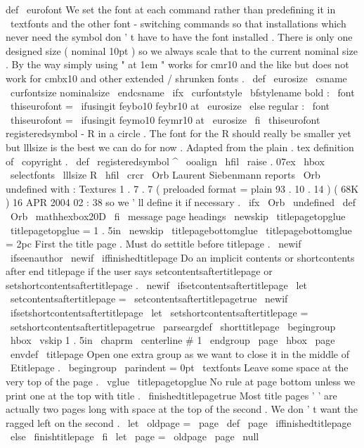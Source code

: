 def
\
eurofont
{
%
%
We
set
the
font
at
each
command
rather
than
predefining
it
in
%
\
textfonts
and
the
other
font
-
switching
commands
so
that
%
installations
which
never
need
the
symbol
don
'
t
have
to
have
the
%
font
installed
.
%
%
There
is
only
one
designed
size
(
nominal
10pt
)
so
we
always
scale
%
that
to
the
current
nominal
size
.
%
%
By
the
way
simply
using
"
at
1em
"
works
for
cmr10
and
the
like
but
%
does
not
work
for
cmbx10
and
other
extended
/
shrunken
fonts
.
%
\
def
\
eurosize
{
\
csname
\
curfontsize
nominalsize
\
endcsname
}
%
%
\
ifx
\
curfontstyle
\
bfstylename
%
bold
:
\
font
\
thiseurofont
=
\
ifusingit
{
feybo10
}
{
feybr10
}
at
\
eurosize
\
else
%
regular
:
\
font
\
thiseurofont
=
\
ifusingit
{
feymo10
}
{
feymr10
}
at
\
eurosize
\
fi
\
thiseurofont
}
%
registeredsymbol
-
R
in
a
circle
.
The
font
for
the
R
should
really
%
be
smaller
yet
but
lllsize
is
the
best
we
can
do
for
now
.
%
Adapted
from
the
plain
.
tex
definition
of
\
copyright
.
%
\
def
\
registeredsymbol
{
%
^
{
{
\
ooalign
{
\
hfil
\
raise
.
07ex
\
hbox
{
\
selectfonts
\
lllsize
R
}
%
\
hfil
\
crcr
\
Orb
}
}
%
}
%
}
%
Laurent
Siebenmann
reports
\
Orb
undefined
with
:
%
Textures
1
.
7
.
7
(
preloaded
format
=
plain
93
.
10
.
14
)
(
68K
)
16
APR
2004
02
:
38
%
so
we
'
ll
define
it
if
necessary
.
%
\
ifx
\
Orb
\
undefined
\
def
\
Orb
{
\
mathhexbox20D
}
\
fi
\
message
{
page
headings
}
\
newskip
\
titlepagetopglue
\
titlepagetopglue
=
1
.
5in
\
newskip
\
titlepagebottomglue
\
titlepagebottomglue
=
2pc
%
First
the
title
page
.
Must
do
settitle
before
titlepage
.
\
newif
\
ifseenauthor
\
newif
\
iffinishedtitlepage
%
Do
an
implicit
contents
or
shortcontents
after
end
titlepage
if
the
%
user
says
setcontentsaftertitlepage
or
setshortcontentsaftertitlepage
.
%
\
newif
\
ifsetcontentsaftertitlepage
\
let
\
setcontentsaftertitlepage
=
\
setcontentsaftertitlepagetrue
\
newif
\
ifsetshortcontentsaftertitlepage
\
let
\
setshortcontentsaftertitlepage
=
\
setshortcontentsaftertitlepagetrue
\
parseargdef
\
shorttitlepage
{
\
begingroup
\
hbox
{
}
\
vskip
1
.
5in
\
chaprm
\
centerline
{
#
1
}
%
\
endgroup
\
page
\
hbox
{
}
\
page
}
\
envdef
\
titlepage
{
%
%
Open
one
extra
group
as
we
want
to
close
it
in
the
middle
of
\
Etitlepage
.
\
begingroup
\
parindent
=
0pt
\
textfonts
%
Leave
some
space
at
the
very
top
of
the
page
.
\
vglue
\
titlepagetopglue
%
No
rule
at
page
bottom
unless
we
print
one
at
the
top
with
title
.
\
finishedtitlepagetrue
%
%
Most
title
pages
'
'
are
actually
two
pages
long
with
space
%
at
the
top
of
the
second
.
We
don
'
t
want
the
ragged
left
on
the
second
.
\
let
\
oldpage
=
\
page
\
def
\
page
{
%
\
iffinishedtitlepage
\
else
\
finishtitlepage
\
fi
\
let
\
page
=
\
oldpage
\
page
\
null
}
%
}
